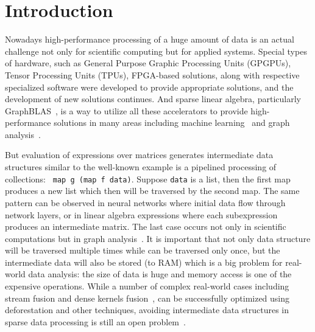 \section{Introduction}

Nowadays high-performance processing of a huge amount of data is an actual challenge not only for scientific computing but for applied systems.
Special types of hardware, such as General Purpose Graphic Processing Units (GPGPUs), Tensor Processing Units (TPUs), FPGA-based solutions, along with respective specialized software were developed to provide appropriate solutions, and the development of new solutions continues. And sparse linear algebra, particularly GraphBLAS~\cite{buluc2017graphblas}, is a way to utilize all these accelerators to provide high-performance solutions in many areas including machine learning~\cite{Kepner2017} and graph analysis~\cite{graphblast}.

But evaluation of expressions over matrices generates intermediate data structures similar to the well-known example is a pipelined processing of collections: \verb| map g (map f data)|. Suppose \verb|data| is a list, then the first map produces a new list which then will be traversed by the second map. The same pattern can be observed in neural networks where initial data flow through network layers, or in linear algebra expressions where each subexpression produces an intermediate matrix. The last case occurs not only in scientific computations but in graph analysis~\cite{graphblast}. It is important that not only data structure will be traversed multiple times while can be traversed only once, but the intermediate data will also be stored (to RAM) which is a big problem for real-world data analysis: the size of data is huge and memory access is one of the expensive operations.
While a number of complex real-world cases including stream fusion and dense kernels fusion~\cite{fusion-boosting-memory-computations}, can be successfully optimized using deforestation and other techniques, avoiding intermediate data structures in sparse data processing is still an open problem~\cite{graphblast}.
